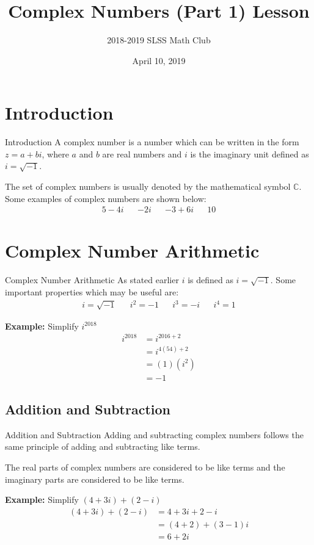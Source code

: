 \documentclass{beamer}
\title{Complex Numbers (Part 1) Lesson}
\author{2018-2019 SLSS Math Club}
\date{April 10, 2019}
\begin{document}
\frame{\titlepage}

\section{Introduction}
\begin{frame}{Introduction}
    A complex number is a number which can be written in the form $z=a + bi$, where $a$ and $b$ are real numbers and $i$ is the imaginary unit defined as $i = \sqrt{-1}$. \newline
    
    The set of complex numbers is usually denoted by the mathematical symbol $\mathbb{C}$. Some examples of complex numbers are shown below:
    \begin{align*}
        5 - 4i && -2i && -3 + 6i && 10
    \end{align*}
\end{frame}

\section{Complex Number Arithmetic}
\begin{frame}{Complex Number Arithmetic}
    As stated earlier $i$ is defined as $i = \sqrt{-1}$. Some important properties which may be useful are:
    \begin{align*}
        i = \sqrt{-1} && i^2 = -1 && i^3 = -i && i^4 = 1
    \end{align*}
    
    \textbf{Example:} Simplify $i^{2018}$
    \begin{align*}
        i^{2018} &= i^{2016 + 2} \\
                &= i^{4(54) + 2} \\
                &= (1)(i^2) \\
                &= -1
    \end{align*}
\end{frame}

\subsection{Addition and Subtraction}
\begin{frame}{Addition and Subtraction}
    Adding and subtracting complex numbers follows the same principle of adding and subtracting like terms. \newline
    
    The real parts of complex numbers are considered to be like terms and the imaginary parts are considered to be like terms. \newline

    \textbf{Example:} Simplify $(4 + 3i) + (2 - i)$
    \begin{align*}
        (4 + 3i) + (2 - i) &= 4 + 3i + 2 - i \\
        &= (4 + 2) + (3 - 1)i \\
        &= 6 + 2i
    \end{align*}
\end{frame}
\end{document}
